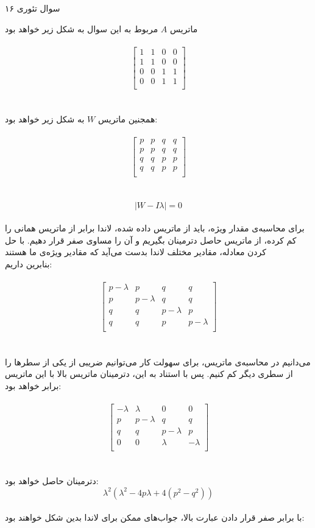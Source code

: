 سوال تئوری ۱۶

ماتریس
$A$
مربوط به این سوال به شکل زیر خواهد بود
\\
\\
$$
\begin{bmatrix}
1 & 1 & 0 & 0 \\
1 & 1 & 0 & 0 \\
0 & 0 & 1 & 1 \\
0 & 0 & 1 & 1 \\ 
\end{bmatrix}
$$
\\
\\
همجنین ماتریس 
$W$
به شکل زیر خواهد بود:
\\
\\
$$
\begin{bmatrix}
p & p & q & q \\
p & p & q & q \\
q & q & p & p \\
q & q & p & p \\ 
\end{bmatrix}
$$
\\
\\
$$|W - I\lambda| = 0$$
\\


برای محاسبه‌ی مقدار ویژه، باید از ماتریس داده شده، لاندا برابر از ماتریس همانی را کم کرده، از ماتریس حاصل دترمینان بگیریم و آن را مساوی صفر قرار دهیم. با حل کردن معادله، مقادیر مختلف لاندا بدست می‌آید که مقادیر ویژه‌ی ما هستند
\\
بنابرین داریم:
\\
\\
$$
\begin{bmatrix}
p - \lambda & p & q & q \\
p & p - \lambda & q & q \\
q & q & p - \lambda & p \\
q & q & p & p -\lambda \\ 
\end{bmatrix}
$$
\\
\\
می‌دانیم در محاسبه‌ی ماتریس، برای سهولت کار می‌توانیم ضریبی از یکی از سطرها را از سطری دیگر کم کنیم. پس با استناد به این، دترمینان ماتریس بالا با این ماتریس برابر خواهد بود:
\\
\\
$$
\begin{bmatrix}
-\lambda & \lambda & 0 & 0 \\
p & p - \lambda & q & q \\
q & q & p - \lambda & p \\
0 & 0 & \lambda & -\lambda \\ 
\end{bmatrix}
$$
\\
\\
دترمینان حاصل خواهد بود:
\\
$$\lambda^2(\lambda^2 - 4p\lambda + 4(p^2 - q^2))$$
\\
با برابر صفر قرار دادن عبارت بالا، جواب‌های ممکن برای لاندا بدین شکل خواهند بود:
\\

